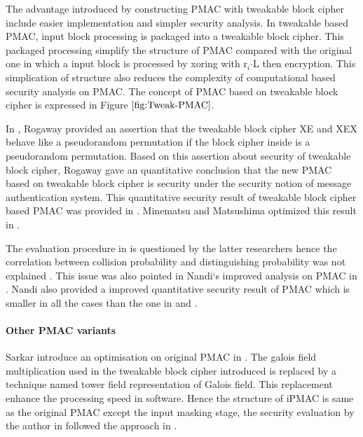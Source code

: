 \documentclass{article}
\begin{document}
The advantage introduced by constructing PMAC with tweakable block cipher include easier implementation and simpler security analysis. In tweakable based PMAC, input block processing is packaged into a tweakable block cipher. This packaged processing simplify the structure of PMAC compared with the original one in which a input block is processed by xoring with r$_i$$\cdot$L then encryption. This simplication of structure also reduces the complexity of computational based security analysis on PMAC.  The concept of PMAC based on tweakable block cipher is expressed in Figure $\ref{fig:Tweak-PMAC}$.

In \cite{tweak_pmac}, Rogaway provided an assertion that the tweakable block cipher XE and XEX behave like a pseudorandom permutation if the block cipher inside is a pseudorandom permutation. Based on this assertion about security of tweakable block cipher, Rogaway gave an quantitative conclusion that the new PMAC based on tweakable block cipher is security under the security notion of message authentication system. This quantitative security result of tweakable block cipher based PMAC was provided in \cite{tweak_pmac}.
Minematsu and Matsushima optimized this result in \cite{new}. 

The evaluation procedure in \cite{pmac} is questioned by the latter researchers hence the correlation between collision probability and 
distinguishing probability was not explained . This issue was also pointed in Nandi`s improved analysis on PMAC in \cite{improve_pmac}. Nandi also provided a improved quantitative security result of PMAC which is smaller in all the cases than the one in \cite{pmac} and \cite{new}. 

\paragraph{Other PMAC variants}
Sarkar introduce an optimisation on original PMAC in \cite{iPMAC}. The galois field multiplication used in the tweakable block cipher introduced is replaced by a technique named tower field representation of Galois field. This replacement enhance the processing speed in software.
Hence the structure of iPMAC is same as the original PMAC except the input masking stage, the security evaluation by the author in \cite{iPMAC} followed the approach in \cite{pmac}.
\end{document}
